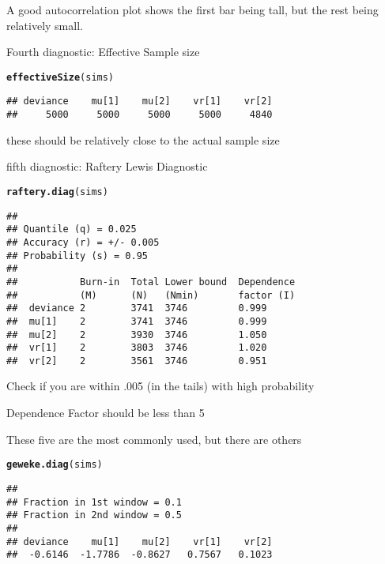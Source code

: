 \documentclass[12pt,letterpaper,oneside]{article}\usepackage{graphicx, color}
\makeatletter
\newcommand{\hlfunctioncall}[1]{\textcolor[rgb]{0.501960784313725,0,0.329411764705882}{\textbf{#1}}}%
\newenvironment{kframe}{%
 \def\at@end@of@kframe{}%
 \ifinner\ifhmode%
  \def\at@end@of@kframe{\end{minipage}}%
  \begin{minipage}{\columnwidth}%
 \fi\fi%
 \def\FrameCommand##1{\hskip\@totalleftmargin \hskip-\fboxsep
 \colorbox{shadecolor}{##1}\hskip-\fboxsep
     \hskip-\linewidth \hskip-\@totalleftmargin \hskip\columnwidth}%
 \MakeFramed {\advance\hsize-\width
   \@totalleftmargin\z@ \linewidth\hsize
   \@setminipage}}%
 {\par\unskip\endMakeFramed%
 \at@end@of@kframe}
\newenvironment{knitrout}{}{} %
\makeatother
\begin{document}
A good autocorrelation plot shows the first bar being tall, but the rest being relatively small.

Fourth diagnostic: Effective Sample size
\begin{knitrout}\scriptsize
{}\color{fgcolor}\begin{kframe}
\begin{alltt}
\hlfunctioncall{effectiveSize}(sims)
\end{alltt}
\begin{verbatim}
## deviance    mu[1]    mu[2]    vr[1]    vr[2] 
##     5000     5000     5000     5000     4840
\end{verbatim}
\end{kframe}
\end{knitrout}

these should be relatively close to the actual sample size

fifth diagnostic: Raftery Lewis Diagnostic
\begin{knitrout}\scriptsize
{}\color{fgcolor}\begin{kframe}
\begin{alltt}
\hlfunctioncall{raftery.diag}(sims)
\end{alltt}
\begin{verbatim}
## 
## Quantile (q) = 0.025
## Accuracy (r) = +/- 0.005
## Probability (s) = 0.95 
##                                                 
##           Burn-in  Total Lower bound  Dependence
##           (M)      (N)   (Nmin)       factor (I)
##  deviance 2        3741  3746         0.999     
##  mu[1]    2        3741  3746         0.999     
##  mu[2]    2        3930  3746         1.050     
##  vr[1]    2        3803  3746         1.020     
##  vr[2]    2        3561  3746         0.951
\end{verbatim}
\end{kframe}
\end{knitrout}

Check if you are within .005 (in the tails) with high probability

Dependence Factor should be less than 5

These five are the most commonly used, but there are others
\begin{knitrout}\scriptsize
{}\color{fgcolor}\begin{kframe}
\begin{alltt}
\hlfunctioncall{geweke.diag}(sims)
\end{alltt}
\begin{verbatim}
## 
## Fraction in 1st window = 0.1
## Fraction in 2nd window = 0.5 
## 
## deviance    mu[1]    mu[2]    vr[1]    vr[2] 
##  -0.6146  -1.7786  -0.8627   0.7567   0.1023
\end{verbatim}
\end{kframe}
\end{knitrout}
\end{document}
